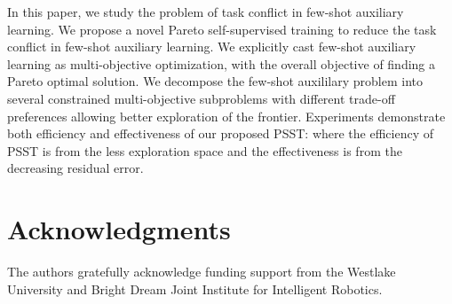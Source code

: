 \documentclass[final]{cvpr}
\begin{document}
In this paper, we study the problem of task conflict in few-shot auxiliary learning. 
We propose a novel  
Pareto self-supervised training to reduce the task conflict in few-shot auxiliary learning.
We explicitly cast few-shot auxiliary learning as multi-objective optimization, with the overall objective of finding a Pareto optimal solution.
We decompose the few-shot auxililary problem into several constrained multi-objective subproblems with different trade-off preferences allowing better exploration of the frontier.  
Experiments demonstrate both efficiency and effectiveness of our proposed PSST: where the efficiency of PSST is from the less exploration space and the effectiveness is from the decreasing residual error.

\section{Acknowledgments}
The authors gratefully acknowledge funding support from the Westlake University and Bright Dream Joint Institute for Intelligent Robotics.
\end{document}
